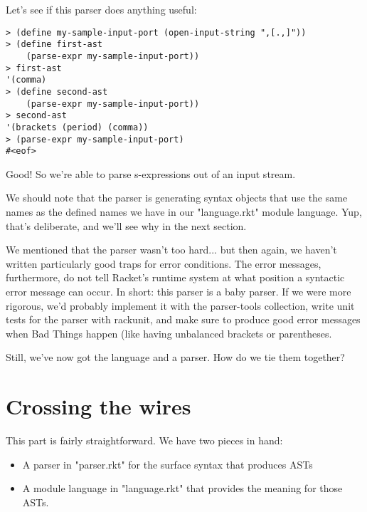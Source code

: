 \documentclass{article}
\begin{document}
Let's see if this parser does anything useful:
\begin{verbatim}
> (define my-sample-input-port (open-input-string ",[.,]"))
> (define first-ast
    (parse-expr my-sample-input-port))
> first-ast
'(comma)
> (define second-ast
    (parse-expr my-sample-input-port))
> second-ast
'(brackets (period) (comma))
> (parse-expr my-sample-input-port)
#<eof>
\end{verbatim}
Good! So we're able to parse s-expressions out of an input stream.

We should note that the parser is generating syntax objects that use
the same names as the defined names we have in our "language.rkt"
module language. Yup, that's deliberate, and we'll see why in the next
section.


We mentioned that the parser wasn't too hard... but then again, we
haven't written particularly good traps for error conditions.  The
error messages, furthermore, do not tell Racket's runtime system at
what position a syntactic error message can occur.  In short: this
parser is a baby parser. If we were more rigorous, we'd probably
implement it with the parser-tools collection, write unit tests for
the parser with rackunit, and make sure to produce good error messages
when Bad Things happen (like having unbalanced brackets or
parentheses.

Still, we've now got the language and a parser. How do we tie them together?

\section{Crossing the wires}
This part is fairly straightforward. We have two pieces in hand:

\begin{itemize}
\item A parser in "parser.rkt" for the surface syntax that produces ASTs

\item A module language in "language.rkt" that provides the meaning for those ASTs.
\end{itemize}
\end{document}
